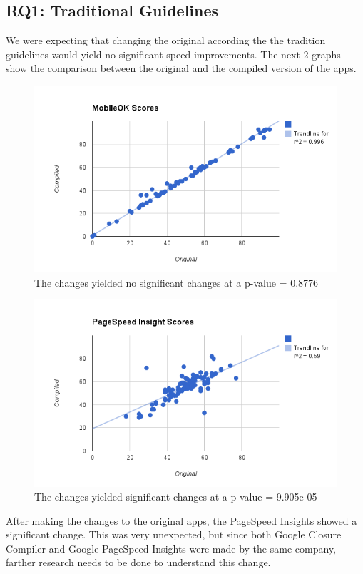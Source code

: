 \documentclass{acm_proc_article-sp}
\begin{document}
\subsection{RQ1: Traditional Guidelines}
We were expecting that changing the original according the the tradition guidelines would yield no significant speed improvements. 
The next 2 graphs show the comparison between the original and the compiled version of the apps.  
\begin{figure}[h!]
    \includegraphics[scale=0.4]{mobileokrq1}
    \caption{The changes yielded no significant changes at a p-value = 0.8776}
\end{figure}

\begin{figure}[h!]
    \includegraphics[scale=0.4]{pagespeedrq1}
    \caption{The changes yielded significant changes at a p-value = 9.905e-05}
\end{figure}

After making the changes to the original apps, the PageSpeed Insights showed a significant change. 
This was very unexpected, but since both Google Closure Compiler and Google PageSpeed Insights were made by the same company, farther research needs to be done to understand this change.
\end{document}
